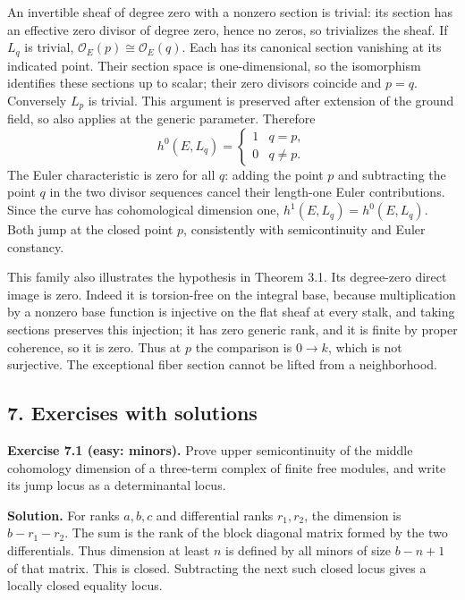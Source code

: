 \documentclass[11pt]{article}
\begin{document}
An invertible sheaf of degree zero with a nonzero section is trivial:
its section has an effective zero divisor of degree zero, hence no
zeros, so trivializes the sheaf. If \(L_q\) is trivial,
\(\mathcal O_E(p)\cong\mathcal O_E(q)\). Each has its canonical section
vanishing at its indicated point. Their section space is
one-dimensional, so the isomorphism identifies these sections up to
scalar; their zero divisors coincide and \(p=q\). Conversely \(L_p\) is
trivial. This argument is preserved after extension of the ground field,
so also applies at the generic parameter. Therefore \[
h^0(E,L_q)=\begin{cases}1&q=p,\\0&q\ne p.\end{cases}
\] The Euler characteristic is zero for all \(q\): adding the point
\(p\) and subtracting the point \(q\) in the two divisor sequences
cancel their length-one Euler contributions. Since the curve has
cohomological dimension one, \(h^1(E,L_q)=h^0(E,L_q)\). Both jump at the
closed point \(p\), consistently with semicontinuity and Euler
constancy.

This family also illustrates the hypothesis in Theorem 3.1. Its
degree-zero direct image is zero. Indeed it is torsion-free on the
integral base, because multiplication by a nonzero base function is
injective on the flat sheaf at every stalk, and taking sections
preserves this injection; it has zero generic rank, and it is finite by
proper coherence, so it is zero. Thus at \(p\) the comparison is
\(0\to k\), which is not surjective. The exceptional fiber section
cannot be lifted from a neighborhood.

\subsection{7. Exercises with solutions}\label{exercises-with-solutions}

\textbf{Exercise 7.1 (easy: minors).} Prove upper semicontinuity of the
middle cohomology dimension of a three-term complex of finite free
modules, and write its jump locus as a determinantal locus.

\textbf{Solution.} For ranks \(a,b,c\) and differential ranks
\(r_1,r_2\), the dimension is \(b-r_1-r_2\). The sum is the rank of the
block diagonal matrix formed by the two differentials. Thus dimension at
least \(n\) is defined by all minors of size \(b-n+1\) of that matrix.
This is closed. Subtracting the next such closed locus gives a locally
closed equality locus.
\end{document}
